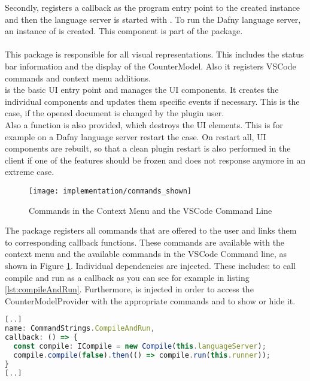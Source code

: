 Secondly,  registers a callback as the program entry point to the created  instance
and then the language server is started with .
To run the Dafny language server, an instance of  is created.
This component is part of the  package.\\

\textbf{}\\
This package is responsible for all visual representations.
This includes the status bar information and the display of the CounterModel.
Also it registers VSCode commands and context menu additions. \\

 is the basic UI entry point and manages the UI components.
It creates the individual components and updates them specific events if necessary.
This is the case, if the opened document is changed by the plugin user.\\

Also a  function is also provided, which destroys the UI elements. This is for example
on a Dafny language server restart the case. On restart all, UI components are rebuilt,
so that a clean plugin restart is also performed in the client if one of the features should
be frozen and does not response anymore in an extreme case.\\

\begin{figure}[H]
    \centering
    \texttt{[image: implementation/commands\_shown]}
    \caption{Commands in the Context Menu and the VSCode Command Line}
    \label{fig:commands_shown}
\end{figure}

The  package registers all commands that are offered to the user
and links them to corresponding callback functions.
These commands are available with the context menu
and the available commands in the VSCode Command line, as shown in Figure \ref{fig:commands_shown}.
Individual dependencies are injected. These includes:
 to call compile and run as a callback as you can see for example in listing \ref{lst:compileAndRun}.
Furthermore,  is injected
in order to access the CounterModelProvider with the appropriate commands and to show or hide it.

\begin{lstlisting}[language=typescript, caption={Excerpt from \code{commands.ts}}, captionpos=b, label={lst:compileAndRun}]
[..]
name: CommandStrings.CompileAndRun,
callback: () => {
  const compile: ICompile = new Compile(this.languageServer);
  compile.compile(false).then(() => compile.run(this.runner));
}
[..]
\end{lstlisting}

